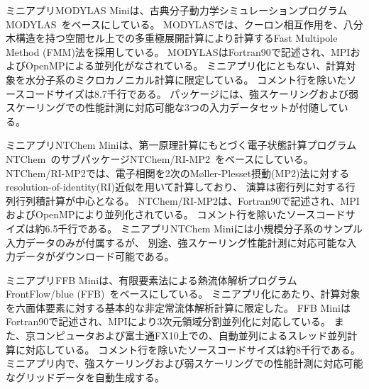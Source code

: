 ミニアプリMODYLAS Miniは、古典分子動力学シミュレーションプログラムMODYLAS~\cite{Modylas_url,Modylas_andoh2013}をベースにしている。
MODYLASでは、クーロン相互作用を、八分木構造を持つ空間セル上での多重極展開計算により計算するFast Multipole Method (FMM)法を採用している。
MODYLASはFortran90で記述され、MPIおよびOpenMPによる並列化がなされている。
ミニアプリ化にともない、計算対象を水分子系のミクロカノニカル計算に限定している。
コメント行を除いたソースコードサイズは8.7千行である。
パッケージには、強スケーリングおよび弱スケーリングでの性能計測に対応可能な3つの入力データセットが付随している。

ミニアプリNTChem Miniは、第一原理計算にもとづく電子状態計算プログラムNTChem~\cite{NTChem_url}のサブパッケージNTChem/RI-MP2~\cite{NTChem_katouda2013}をベースにしている。
NTChem/RI-MP2では、電子相関を2次のM{\o}ller-Plesset摂動(MP2)法に対するresolution-of-identity(RI)近似を用いて計算しており、
演算は密行列に対する行列行列積計算が中心となる。
NTChem/RI-MP2は、Fortran90で記述され、MPIおよびOpenMPにより並列化されている。
コメント行を除いたソースコードサイズは約6.5千行である。
ミニアプリNTChem Miniには小規模分子系のサンプル入力データのみが付属するが、
別途、強スケーリング性能計測に対応可能な入力データがダウンロード可能である。

ミニアプリFFB Miniは、有限要素法による熱流体解析プログラムFrontFlow/blue (FFB)~\cite{FFB_minami2012,FFB_kumahata2013}をベースにしている。
ミニアプリ化にあたり、計算対象を六面体要素に対する基本的な非定常流体解析計算に限定した。
FFB MiniはFortran90で記述され、MPIにより3次元領域分割並列化に対応している。
また、京コンピュータおよび富士通FX10上での、自動並列によるスレッド並列計算に対応している。
コメント行を除いたソースコードサイズは約8千行である。
ミニアプリ内で、強スケーリングおよび弱スケーリングでの性能計測に対応可能なグリッドデータを自動生成する。

